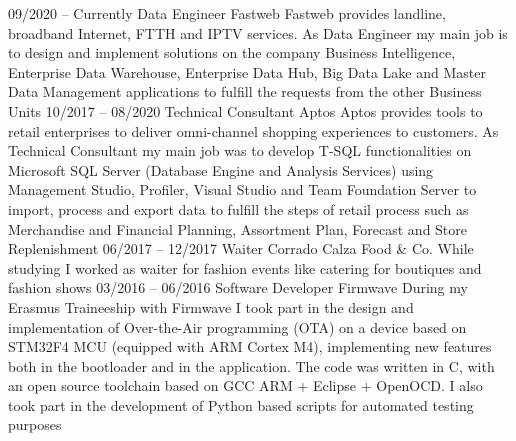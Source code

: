 \documentclass[9pt]{developercv} %
\begin{document}
\begin{entrylist}
	\entry
		{09/2020 -- Currently}
		{Data Engineer}
		{Fastweb}
		{Fastweb provides landline, broadband Internet, FTTH and IPTV services. As Data Engineer my main job is to design and implement solutions on the company Business Intelligence, Enterprise Data Warehouse, Enterprise Data Hub, Big Data Lake and Master Data Management applications to fulfill the requests from the other Business Units
		}
		{}
		{}
	\entry
		{10/2017 -- 08/2020}
		{Technical Consultant}
		{Aptos}
		{Aptos provides tools to retail enterprises to deliver omni-channel shopping experiences to customers. As Technical Consultant my main job was to develop T-SQL functionalities on Microsoft SQL Server (Database Engine and Analysis Services) using Management Studio, Profiler, Visual Studio and Team Foundation Server to import, process and export data to fulfill the steps of retail process such as Merchandise and Financial Planning, Assortment Plan, Forecast and Store Replenishment
		}
		{}
		{}
	\entry
		{06/2017 -- 12/2017}
		{Waiter}
		{Corrado Calza Food \& Co.}
		{While studying I worked as waiter for fashion events like catering for boutiques and fashion shows}
		{}
		{}
	\entry
		{03/2016 -- 06/2016}
		{Software Developer}
		{Firmwave}
		{During my Erasmus Traineeship with Firmwave I took part in the design and implementation of Over-the-Air programming (OTA) on a device based on STM32F4 MCU (equipped with ARM Cortex M4), implementing new features both in the bootloader and in the application.
		The code was written in C, with an open source toolchain based on GCC ARM + Eclipse + OpenOCD. I also took part in the development of Python based scripts for automated testing purposes}
		{}
		{}
\end{entrylist}
\end{document}
